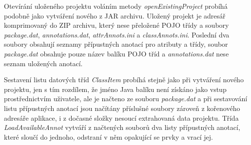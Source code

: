 \documentclass{projekt}
\begin{document}
Otevírání uloženého projektu voláním metody {\it openExistingProject} probíhá podobně jako vytváření nového z JAR archivu. Uložený projekt je adresář komprimovaný do ZIP archivu, který nese přeložené POJO třídy a soubory {\it package.dat}, {\it annotations.dat}, {\it attrAnnots.ini} a {\it classAnnots.ini}. Poslední dva soubory obsahují seznamy přípustných anotací pro atributy a třídy, soubor {\it package.dat} obsahuje pouze název balíku POJO tříd a {\it annotations.dat} nese seznam uložených anotací.


Sestavení listu datových tříd {\it ClassItem} probíhá stejně jako při vytváření nového projektu, jen s tím rozdílem, že jméno Java balíku není získáno jako vstup prostřednictvím uživatele, ale je načteno ze souboru {\it package.dat} a při sestavování listu přípustných anotací jsou načítány příslušné soubory zároveň z kořenového adresáře aplikace, i z dočasné složky nesoucí extrahovaná data projektu. Třída {\it LoadAvailableAnnot} vytváří z načtených souborů dva listy přípustných anotací, které sloučí do jednoho, odstraní v něm opakující se prvky a vrací jej.
\end{document}
